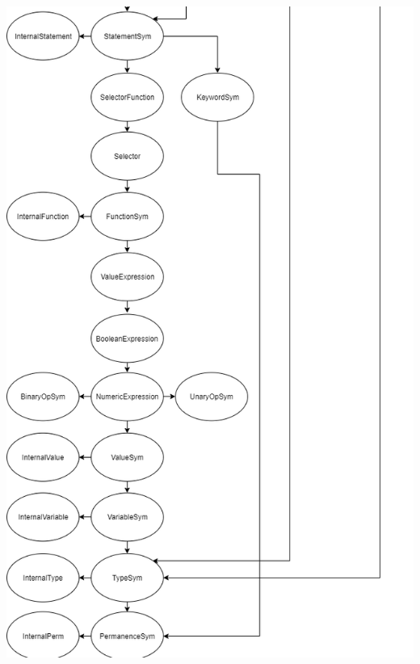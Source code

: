 \documentclass{beamer}
\begin{document}
\begin{frame}
\begin{columns}
\begin{column}{0.5\textwidth}
\includegraphics[scale=0.28]{GOOLClasses_bottom.png}
\end{column}
\end{columns}
\end{frame}

\end{document}
